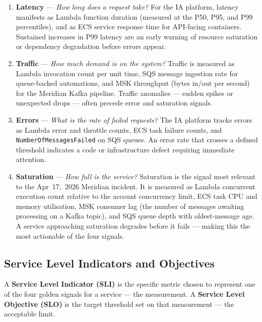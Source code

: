 \begin{enumerate}
    \item \textbf{Latency} --- \emph{How long does a request take?} For
          the IA platform, latency manifests as Lambda function duration
          (measured at the P50, P95, and P99 percentiles), and as ECS
          service response time for API-facing containers. Sustained
          increases in P99 latency are an early warning of resource
          saturation or dependency degradation before errors appear.

    \item \textbf{Traffic} --- \emph{How much demand is on the system?}
          Traffic is measured as Lambda invocation count per unit time,
          SQS message ingestion rate for queue-backed automations, and
          MSK throughput (bytes in/out per second) for the Meridian
          Kafka pipeline. Traffic anomalies --- sudden spikes or
          unexpected drops --- often precede error and saturation
          signals.

    \item \textbf{Errors} --- \emph{What is the rate of failed
          requests?} The IA platform tracks errors as Lambda error and
          throttle counts, ECS task failure counts, and
          \texttt{NumberOfMessagesFailed} on SQS queues. An error rate
          that crosses a defined threshold indicates a code or
          infrastructure defect requiring immediate attention.

    \item \textbf{Saturation} --- \emph{How full is the service?}
          Saturation is the signal most relevant to the Apr~17,~2026
          Meridian incident. It is measured as Lambda concurrent
          execution count relative to the account concurrency limit,
          ECS task CPU and memory utilisation, MSK consumer lag (the
          number of messages awaiting processing on a Kafka topic), and
          SQS queue depth with oldest-message age. A service approaching
          saturation degrades before it fails --- making this the most
          actionable of the four signals.
\end{enumerate}

\subsection{Service Level Indicators and Objectives}

A \textbf{Service Level Indicator (SLI)} is the specific metric chosen
to represent one of the four golden signals for a service --- the
measurement. A \textbf{Service Level Objective (SLO)} is the target
threshold set on that measurement --- the acceptable limit.

